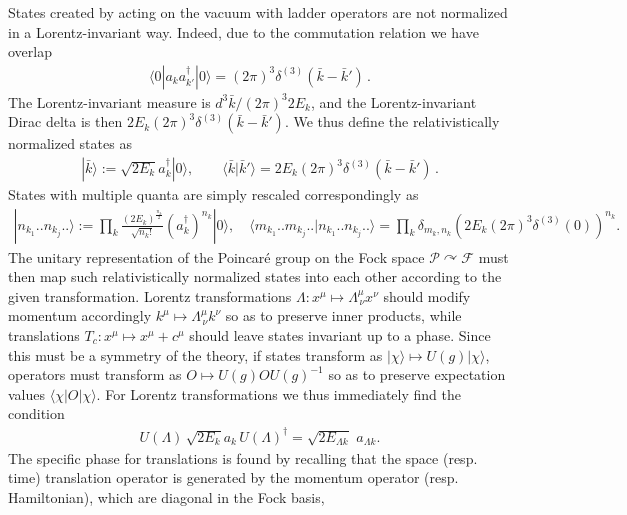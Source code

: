 \documentclass[../QFT_main.tex]{subfiles}
\begin{document}
\begin{mytheorem}
States created by acting on the vacuum with ladder operators are not normalized in a Lorentz-invariant way.
Indeed, due to the commutation relation we have overlap
\begin{align}
    \langle 0 | a_k a_{k'}^{\dagger} |0\rangle = (2\pi)^3 \delta^{(3)}(\bar{k} - \bar{k}')\,.
\end{align}
The Lorentz-invariant measure is {\small$d^3\bar{k}/(2\pi)^3 2E_k$}, and the Lorentz-invariant Dirac delta is then {\small$2E_k (2\pi)^3 \delta^{(3)}(\bar{k} - \bar{k}')$}. 
We thus define the relativistically normalized states as
\begin{align}
    |\bar{k}\rangle := \sqrt{2E_k} a_k^{\dagger} |0\rangle, \qquad \langle \bar{k} | \bar{k}' \rangle = 2E_k (2\pi)^3 \delta^{(3)}(\bar{k} - \bar{k}')\,.
\end{align}
States with multiple quanta are simply rescaled correspondingly as 
\begin{align}
    |{n}_{k_1}.. {n}_{k_j}.. \rangle := \prod_{k} \tfrac{(2E_k)^{\frac{n_k}{2}}}{\sqrt{n_k!}} (a_k^{\dagger})^{n_k} |0\rangle, \quad \langle {m}_{k_1}.. {m}_{k_j}.. | {n}_{k_1}..{n}_{k_j}.. \rangle = \prod_k \delta_{m_k, n_k}\left( 2E_k(2\pi)^3\delta^{(3)}(0) \right)^{n_k}.
\end{align}
The unitary representation of the Poincaré group on the Fock space {\small$\mathcal{P}\curvearrowright\mathcal{F}$} must then map such relativistically normalized states into each other according to the given transformation.
Lorentz transformations $\Lambda: x^\mu \mapsto \Lambda^\mu_{\,\nu} x^\nu$ should modify momentum accordingly $k^\mu \mapsto \Lambda^\mu_{\,\nu} k^\nu$ so as to preserve inner products, while translations $T_c:x^\mu\mapsto x^\mu + c^\mu$ should leave states invariant up to a phase.
Since this must be a symmetry of the theory, if states transform as $|\chi\rangle \mapsto U(g) |\chi\rangle$, operators must transform as $O \mapsto U(g) O U(g)^{-1}$ so as to preserve expectation values $\langle \chi | O | \chi \rangle$.
For Lorentz transformations we thus immediately find the condition
\begin{align}
    U(\Lambda)\, \sqrt{2 E_k}a_k\, U(\Lambda)^\dagger = \sqrt{2 E_{\Lambda k}} \,\,a_{\Lambda k}.
\end{align}
The specific phase for translations is found by recalling that the space (resp. time) translation operator is generated by the momentum operator (resp. Hamiltonian), which are diagonal in the Fock basis,

\end{mytheorem}
\end{document}
